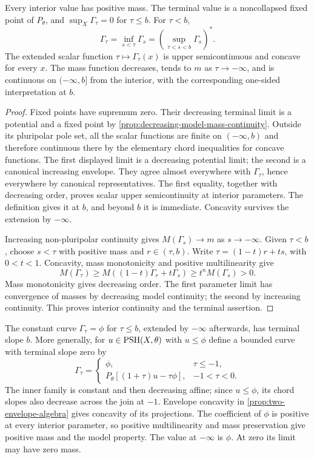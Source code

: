 \begin{proposition}\label{prop:test-curve-parameter-continuity}
Every interior value has positive mass. The terminal value is a noncollapsed fixed point of $P_\theta$, and $\sup_X\Gamma_\tau=0$ for $\tau\leq b$. For $\tau<b$,
\[
 \Gamma_\tau=\inf_{s<\tau}\Gamma_s
                   =(\sup_{\tau<s<b}\Gamma_s)^*.
\]
The extended scalar function $\tau\mapsto\Gamma_\tau(x)$ is upper semicontinuous and concave for every $x$. The mass function decreases, tends to $m$ as $\tau\to-\infty$, and is continuous on $(-\infty,b]$ from the interior, with the corresponding one-sided interpretation at $b$.
\end{proposition}
\begin{proof}
Fixed points have supremum zero. Their decreasing terminal limit is a potential and a fixed point by \cref{prop:decreasing-model-mass-continuity}. Outside its pluripolar pole set, all the scalar functions are finite on $(-\infty,b)$ and therefore continuous there by the elementary chord inequalities for concave functions. The first displayed limit is a decreasing potential limit; the second is a canonical increasing envelope. They agree almost everywhere with $\Gamma_\tau$, hence everywhere by canonical representatives. The first equality, together with decreasing order, proves scalar upper semicontinuity at interior parameters. The definition gives it at $b$, and beyond $b$ it is immediate. Concavity survives the extension by $-\infty$.

Increasing non-pluripolar continuity gives $M(\Gamma_s)\to m$ as $s\to-\infty$. Given $\tau<b$, choose $s<\tau$ with positive mass and $r\in(\tau,b)$. Write $\tau=(1-t)r+ts$, with $0<t<1$. Concavity, mass monotonicity and positive multilinearity give
\[
 M(\Gamma_\tau)\geq M((1-t)\Gamma_r+t\Gamma_s)
                                \geq t^nM(\Gamma_s)>0.
\]
Mass monotonicity gives decreasing order. The first parameter limit has convergence of masses by decreasing model continuity; the second by increasing continuity. This proves interior continuity and the terminal assertion.
\end{proof}

\begin{example}\label{ex:constant-and-associated-test-curves}
The constant curve $\Gamma_\tau=\phi$ for $\tau\leq b$, extended by $-\infty$ afterwards, has terminal slope $b$. More generally, for $u\in\mathrm{PSH}(X,\theta)$ with $u\leq\phi$ define a bounded curve with terminal slope zero by
\[
 \Gamma_\tau=
 \begin{cases}
 \phi,&\tau\leq-1,\\
 P_\theta[(1+\tau)u-\tau\phi],&-1<\tau<0.
 \end{cases}
\]
The inner family is constant and then decreasing affine; since $u\leq\phi$, its chord slopes also decrease across the join at $-1$. Envelope concavity in \cref{prop:two-envelope-algebra} gives concavity of its projections. The coefficient of $\phi$ is positive at every interior parameter, so positive multilinearity and mass preservation give positive mass and the model property. The value at $-\infty$ is $\phi$. At zero its limit may have zero mass.
\end{example}

